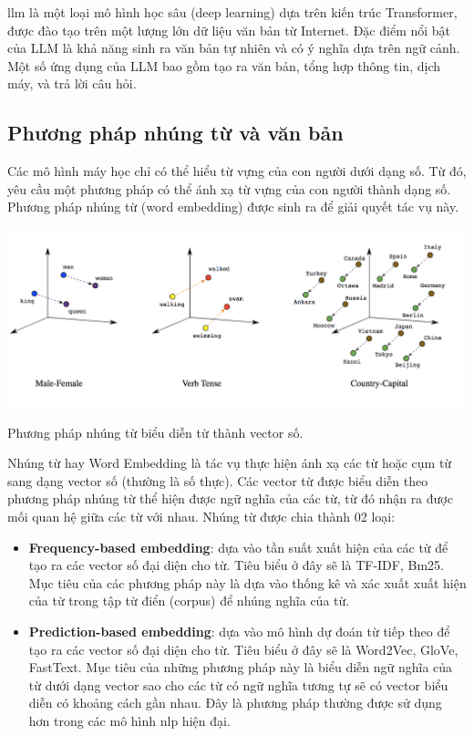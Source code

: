 \documentclass[a4paper, 12pt, openany]{book}
\begin{document}
\acl{llm} là một loại mô hình học sâu (deep learning) dựa trên kiến trúc Transformer, được đào tạo trên một lượng lớn dữ liệu văn bản từ Internet. Đặc điểm nổi bật của LLM là khả năng sinh ra văn bản tự nhiên và có ý nghĩa dựa trên ngữ cảnh. Một số ứng dụng của LLM bao gồm tạo ra văn bản, tổng hợp thông tin, dịch máy, và trả lời câu hỏi.

\subsection{Phương pháp nhúng từ và văn bản}

Các mô hình máy học chỉ có thể hiểu từ vựng của con người dưới dạng số. Từ đó, yêu cầu một phương pháp có thể
ánh xạ từ vựng của con người thành dạng số. Phương pháp nhúng từ (word embedding)
được sinh ra để giải quyết tác vụ này.

\begin{minipage}{\linewidth}
    \captionsetup{type=figure}
    \centering
    \includegraphics[width=\linewidth]{./assets/images/word_embedding.png}
    \caption{Phương pháp nhúng từ biểu diễn từ thành vector số.}
\end{minipage}
\vspace{0.5cm}

Nhúng từ hay Word Embedding là tác vụ thực hiện ánh xạ các từ hoặc cụm từ sang dạng vector
số (thường là số thực). Các vector từ được biểu diễn theo phương pháp nhúng từ thể hiện
được ngữ nghĩa của các từ, từ đó nhận ra được mối quan hệ giữa các từ với nhau. Nhúng
từ được chia thành 02 loại:


\begin{itemize}
    \item \textbf{Frequency-based embedding}: dựa vào tần suất xuất hiện của các từ để tạo ra các
    vector số đại diện cho từ. Tiêu biểu ở đây sẽ là TF-IDF, Bm25. Mục tiêu của các phương pháp này là
    dựa vào thống kê và xác xuất xuất hiện của từ trong tập từ điển (corpus) để nhúng nghĩa của từ.

    \item \textbf{Prediction-based embedding}: dựa vào mô hình dự đoán từ tiếp theo để tạo ra các
    vector số đại diện cho từ. Tiêu biểu ở đây sẽ là Word2Vec, GloVe, FastText. Mục tiêu của những
    phương pháp này là biểu diễn ngữ nghĩa của từ dưới dạng vector sao cho 
    các từ có ngữ nghĩa tương tự sẽ có vector biểu diễn có khoảng cách gần nhau. Đây là phương pháp
    thường được sử dụng hơn trong các mô hình \ac{nlp} hiện đại.
\end{itemize}
\end{document}
